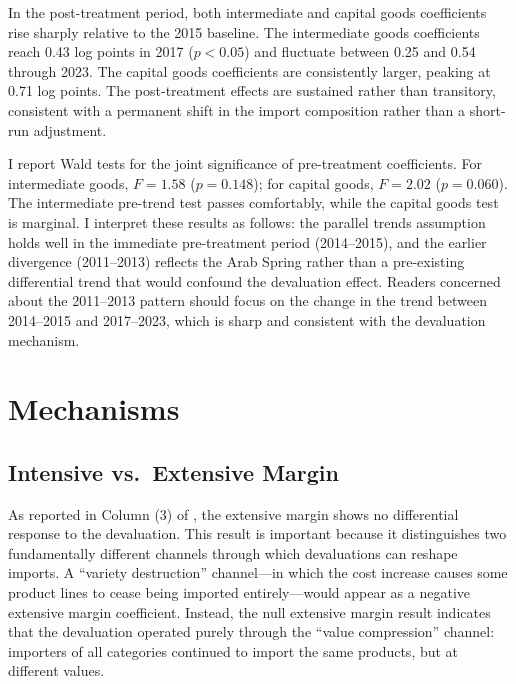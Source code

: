 \documentclass[12pt]{article}
\begin{document}
In the post-treatment period, both intermediate and capital goods coefficients rise sharply relative to the 2015 baseline. The intermediate goods coefficients reach 0.43 log points in 2017 ($p < 0.05$) and fluctuate between 0.25 and 0.54 through 2023. The capital goods coefficients are consistently larger, peaking at 0.71 log points. The post-treatment effects are sustained rather than transitory, consistent with a permanent shift in the import composition rather than a short-run adjustment.

I report Wald tests for the joint significance of pre-treatment coefficients. For intermediate goods, $F = 1.58$ ($p = 0.148$); for capital goods, $F = 2.02$ ($p = 0.060$). The intermediate pre-trend test passes comfortably, while the capital goods test is marginal. I interpret these results as follows: the parallel trends assumption holds well in the immediate pre-treatment period (2014--2015), and the earlier divergence (2011--2013) reflects the Arab Spring rather than a pre-existing differential trend that would confound the devaluation effect. Readers concerned about the 2011--2013 pattern should focus on the change in the trend between 2014--2015 and 2017--2023, which is sharp and consistent with the devaluation mechanism.


\section{Mechanisms}

\subsection{Intensive vs.\ Extensive Margin}

As reported in Column (3) of , the extensive margin shows no differential response to the devaluation. This result is important because it distinguishes two fundamentally different channels through which devaluations can reshape imports. A ``variety destruction'' channel---in which the cost increase causes some product lines to cease being imported entirely---would appear as a negative extensive margin coefficient. Instead, the null extensive margin result indicates that the devaluation operated purely through the ``value compression'' channel: importers of all categories continued to import the same products, but at different values.
\end{document}
